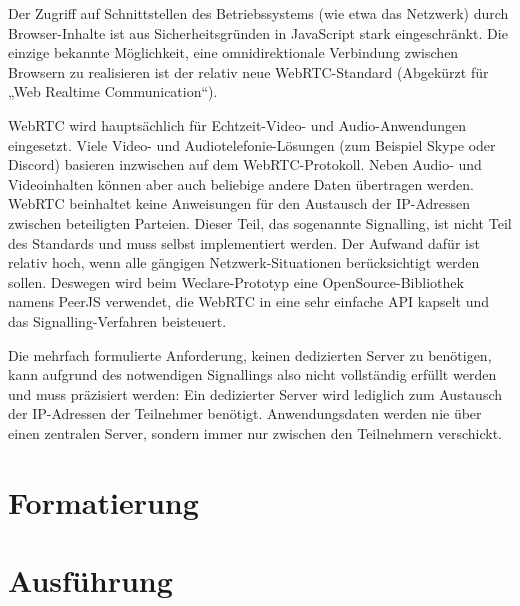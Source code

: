 Der Zugriff auf Schnittstellen des Betriebssystems (wie etwa das Netzwerk) durch Browser-Inhalte ist aus Sicherheitsgründen in JavaScript stark eingeschränkt. Die einzige bekannte Möglichkeit, eine omnidirektionale Verbindung zwischen Browsern zu realisieren ist der relativ neue WebRTC-Standard (Abgekürzt für „Web Realtime Communication“).

WebRTC wird hauptsächlich für Echtzeit-Video- und Audio-Anwendungen eingesetzt. Viele Video- und Audiotelefonie-Lösungen (zum Beispiel Skype oder Discord) basieren inzwischen auf dem WebRTC-Protokoll. Neben Audio- und Videoinhalten können aber auch beliebige andere Daten übertragen werden. WebRTC beinhaltet keine Anweisungen für den Austausch der IP-Adressen zwischen beteiligten Parteien. Dieser Teil, das sogenannte Signalling, ist nicht Teil des Standards und muss selbst implementiert werden. Der Aufwand dafür ist relativ hoch, wenn alle gängigen Netzwerk-Situationen berücksichtigt werden sollen. Deswegen wird beim Weclare-Prototyp eine OpenSource-Bibliothek namens PeerJS verwendet, die WebRTC in eine sehr einfache API kapselt und das Signalling-Verfahren beisteuert.

Die mehrfach formulierte Anforderung, keinen dedizierten Server zu benötigen, kann aufgrund des notwendigen Signallings also nicht vollständig erfüllt werden und muss präzisiert werden: Ein dedizierter Server wird lediglich zum Austausch der IP-Adressen der Teilnehmer benötigt. Anwendungsdaten werden nie über einen zentralen Server, sondern immer nur zwischen den Teilnehmern verschickt.
%
\section{Formatierung}
\label{chap:metriken}

%
\section{Ausführung}
\label{chap:metriken}
